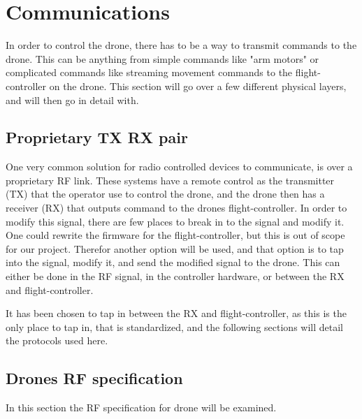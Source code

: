 \section{Communications}\label{s:coms}
In order to control the drone, there has to be a way to transmit commands to the drone. This can be anything from simple commands like "arm motors" or complicated commands like streaming movement commands to the flight-controller on the drone.
This section will go over a few different physical layers, and will then go in detail with.

\subsection*{Proprietary TX RX pair}\label{ss:rc-txrx}
One very common solution for radio controlled devices to communicate, is over a proprietary RF link. These systems have a remote control as the transmitter (TX) that the operator use to control the drone, and the drone then has a receiver (RX) that outputs command to the drones flight-controller.
\newline
In order to modify this signal, there are few places to break in to the signal and modify it. One could rewrite the firmware for the flight-controller, but this is out of scope for our project. Therefor another option will be used, and that option is to tap into the signal, modify it, and send the modified signal to the drone.
This can either be done in the RF signal, in the controller hardware, or between the RX and flight-controller. 

It has been chosen to tap in between the RX and flight-controller, as this is the only place to tap in, that is standardized, and the following sections will detail the protocols used here.\\
\newline

\subsection*{Drones RF specification}
In this section the RF specification for drone will be examined. 


